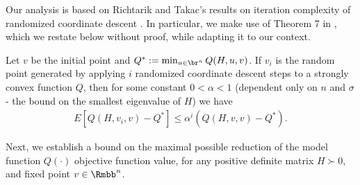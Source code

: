 \documentclass[11pt]{article}
\numberwithin{equation}{section}
\begin{document}





Our analysis is based on Richtarik and Takac's results on iteration complexity of randomized coordinate descent  \cite{Richtarik2012}. In particular, we make use of Theorem 7 in \cite{Richtarik2012}, which we restate below without proof, while adapting it to our context.

\begin{lemma}\label{lem:randomized_CD}

Let $v$ be the initial point and $Q^* := \min_{u\in\br^n} Q(H, u,v)$. If $v_i$ is the random point generated by applying $i$ randomized coordinate descent steps to a strongly convex function $Q$, then for some constant $0 < \alpha < 1$ (dependent only on $n$ and $\sigma$ - the bound on the smallest eigenvalue of $H$) we have
\begin{align}
    E[Q(H,v_i,v) - Q^*] \leq  \alpha^i (Q(H,v,v) - Q^*).
\end{align}
\end{lemma}

Next, we establish a bound on the maximal possible reduction of the model function $Q(\cdot)$ objective function value, for any positive definite matrix $H \succ 0$,  and fixed point $v \in \Rmbb^n$. 
\end{document}
